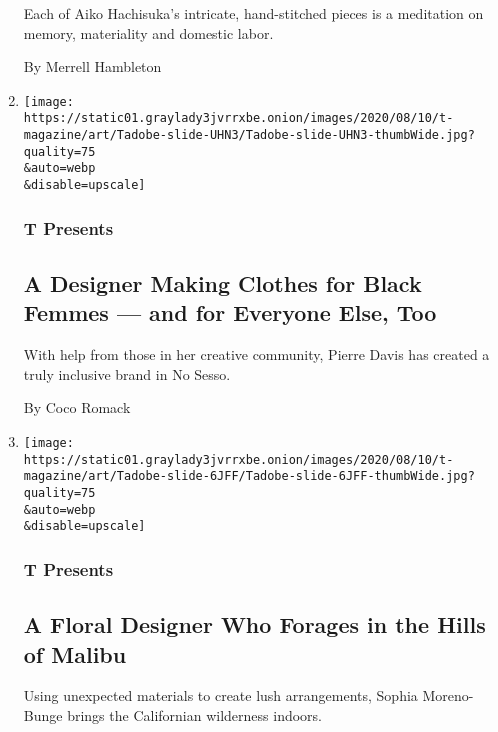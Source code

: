 \begin{enumerate}
  Each of Aiko Hachisuka's intricate, hand-stitched pieces is a
  meditation on memory, materiality and domestic labor.

  By Merrell Hambleton
\item
  \href{/2020/08/10/t-magazine/pierre-davis-no-sesso.html}{}

  \texttt{[image: https://static01.graylady3jvrrxbe.onion/images/2020/08/10/t-magazine/art/Tadobe-slide-UHN3/Tadobe-slide-UHN3-thumbWide.jpg?quality=75\\\&auto=webp\\\&disable=upscale]}

  \hypertarget{t-presents-2}{%
  \subsubsection{T Presents}\label{t-presents-2}}

  \hypertarget{a-designer-making-clothes-for-black-femmes--and-for-everyone-else-too}{%
  \subsection{A Designer Making Clothes for Black Femmes --- and for
  Everyone Else,
  Too}\label{a-designer-making-clothes-for-black-femmes--and-for-everyone-else-too}}

  With help from those in her creative community, Pierre Davis has
  created a truly inclusive brand in No Sesso.

  By Coco Romack
\item
  \href{/2020/08/10/t-magazine/sophia-moreno-bunge-floral-design.html}{}

  \texttt{[image: https://static01.graylady3jvrrxbe.onion/images/2020/08/10/t-magazine/art/Tadobe-slide-6JFF/Tadobe-slide-6JFF-thumbWide.jpg?quality=75\\\&auto=webp\\\&disable=upscale]}

  \hypertarget{t-presents-3}{%
  \subsubsection{T Presents}\label{t-presents-3}}

  \hypertarget{a-floral-designer-who-forages-in-the-hills-of-malibu}{%
  \subsection{A Floral Designer Who Forages in the Hills of
  Malibu}\label{a-floral-designer-who-forages-in-the-hills-of-malibu}}

  Using unexpected materials to create lush arrangements, Sophia
  Moreno-Bunge brings the Californian wilderness indoors.


\end{enumerate}
